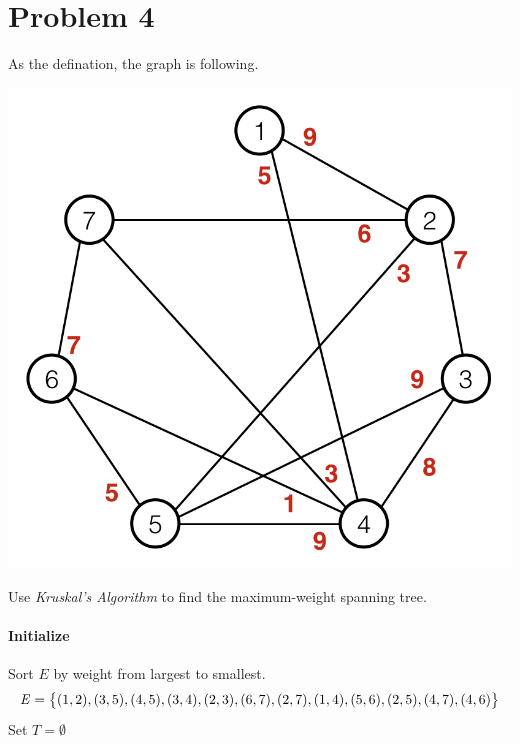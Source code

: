 \documentclass{article}
\begin{document}
\section*{Problem 4}{
    As the defination, the graph is following.
    \begin{center}{
        \includegraphics[scale=0.5]{P4.png}
    }
    \end{center}
    Use \textit{Kruskal's Algorithm} to find the maximum-weight spanning tree.

    \paragraph{Initialize}{
        Sort \(\mathit{E}\) by weight from largest to smallest. 
        \[\mathit{E} = \big{\{} (1,2), (3,5), (4,5), (3,4), (2,3), (6,7), (2,7), (1,4), (5,6), (2,5), (4,7), (4,6)\big{\}}\]
        Set \(\mathit{T}=\emptyset\)

}}
\end{document}
